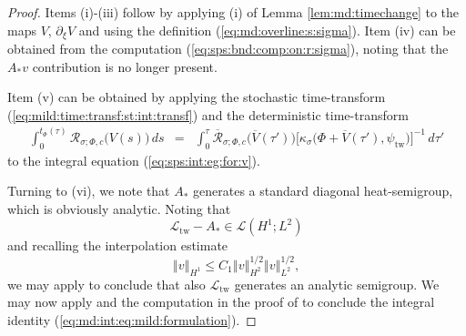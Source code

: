 \documentclass[10pt]{articleHJ}
\newcommand{\norm}[1]{\left\Vert#1\right\Vert}		%
\newcommand{\sref}[1]{(\ref{#1})}                       %
\numberwithin{equation}{section}
\begin{document}
\begin{proof}
Items (i)-(iii) follow by
applying (i) of Lemma \ref{lem:md:timechange}
to the maps $V$, $\partial_\xi V$
and using the definition
\sref{eq:md:overline:s:sigma}.
Item (iv) can be obtained from the computation
\sref{eq:sps:bnd:comp:on:r:sigma},
noting that the $A_* v$ contribution
is no longer present.

Item (v) can be obtained
by applying the stochastic time-transform
\sref{eq:mild:time:transf:st:int:transf}
and the deterministic time-transform
\begin{equation}
\begin{array}{lcl}
\int_0^{t_{\Phi}(\tau)}
  \mathcal{R}_{\sigma;\Phi,c}\big( V(s) \big) \, ds
& = & \int_0^{\tau}
  \overline{\mathcal{R}}_{\sigma;\Phi,c}
    \big( \overline{V}(\tau') \big)
    \big[\kappa_{\sigma}\big(\Phi + \overline{V}(\tau'),
       \psi_{\mathrm{tw}} \big) \big]^{-1} \, d \tau'
\end{array}
\end{equation}
to the integral equation
\sref{eq:sps:int:eg:for:v}.

Turning to (vi), we note that
$A_*$ generates a standard diagonal
heat-semigroup,
which is obviously analytic.
Noting that
\begin{equation}
\mathcal{L}_{\mathrm{tw}} - A_*
 \in \mathcal{L}( H^1 ; L^2)
\end{equation}
and recalling the interpolation estimate
\begin{equation}
\norm{ v}_{H^1} \le
C_1 \norm{ v}_{H^2}^{1/2}
    \norm{v}_{L^2}^{1/2},
\end{equation}
we may apply \cite[Prop 3.2.2(iii)]{lorenzi2004analytic}
to conclude that also $\mathcal{L}_{\mathrm{tw}}$
generates an analytic semigroup.
We may now
apply \cite[Prop 6.3]{DaPratoZab}
and the computation in the proof of
\cite[Prop 4.1.4]{lorenzi2004analytic}
to conclude the integral
identity
\sref{eq:md:int:eq:mild:formulation}.
\end{proof}
\end{document}
